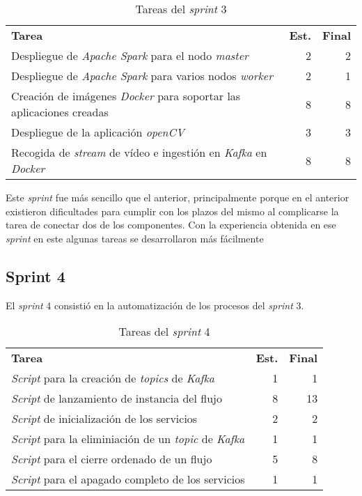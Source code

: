 \begin{table}[H]
	\begin{tabularx}{\linewidth}{X r r}
		\toprule \textbf{Tarea} & \textbf{Est.} & \textbf{Final}\\
		\otoprule
		Despliegue de \textit{Apache Spark} para el nodo \textit{master} & 2 & 2\\
		Despliegue de \textit{Apache Spark} para varios nodos \textit{worker} & 2 & 1\\
		Creación de imágenes \textit{Docker} para soportar las aplicaciones creadas & 8 & 8\\
		Despliegue de la aplicación \textit{openCV} & 3 & 3 \\
		Recogida de \textit{stream} de vídeo e ingestión en \textit{Kafka} en \textit{Docker} & 8 & 8\\
		\bottomrule
	\end{tabularx}
	\caption{Tareas del \textit{sprint} 3}
	\label{tab:sprint3}
\end{table}

Este \textit{sprint} fue más sencillo que el anterior, principalmente porque en el anterior existieron dificultades para cumplir con los plazos del mismo al complicarse la tarea de conectar dos de los componentes. Con la experiencia obtenida en ese \textit{sprint} en este algunas tareas se desarrollaron más fácilmente

\subsection{Sprint 4}

El \textit{sprint} 4 consistió en la automatización de los procesos del \textit{sprint} 3. 

\begin{table}[H]
	\begin{tabularx}{\linewidth}{X r r}
		\toprule \textbf{Tarea} & \textbf{Est.} & \textbf{Final}\\
		\otoprule
		\textit{Script} para la creación de \textit{topics} de \textit{Kafka} & 1 & 1\\
		\textit{Script} de lanzamiento de instancia del flujo & 8 & 13 \\
		\textit{Script} de inicialización de los servicios & 2 & 2\\
		\textit{Script} para la eliminiación de un \textit{topic} de \textit{Kafka} & 1 & 1\\
		\textit{Script} para el cierre ordenado de un flujo & 5 & 8\\
		\textit{Script} para el apagado completo de los servicios & 1 & 1\\
		\bottomrule
	\end{tabularx}
	\caption{Tareas del \textit{sprint} 4}
	\label{tab:sprint4}
\end{table}

